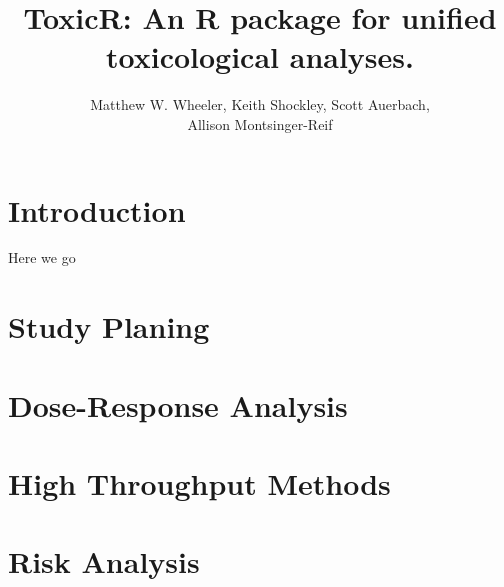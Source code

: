 \documentclass[12pt]{article}
\title{ToxicR: An  R package for  unified toxicological analyses.}
\author{Matthew W. Wheeler, Keith Shockley, Scott Auerbach, \\
Allison Montsinger-Reif}
\begin{document}
\maketitle

\section{Introduction}

Here we go
\section{Study Planing}

\section{Dose-Response Analysis}

\section{High Throughput Methods}

\section{Risk Analysis}
\end{document}
